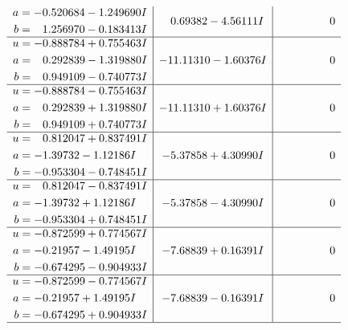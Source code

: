 \documentclass[1p]{elsarticle_modified}
\theoremstyle{definition}
\begin{document}
$$\begin{array}{c|c|c}
\begin{aligned}
a &= -0.520684 - 1.249690 I \\
b &= \phantom{-}1.256970 - 0.183413 I\end{aligned}
 & \phantom{-}0.69382 - 4.56111 I & \phantom{-0.000000 } 0 \\ \hline\begin{aligned}
u &= -0.888784 + 0.755463 I \\
a &= \phantom{-}0.292839 - 1.319880 I \\
b &= \phantom{-}0.949109 - 0.740773 I\end{aligned}
 & -11.11310 - 1.60376 I & \phantom{-0.000000 } 0 \\ \hline\begin{aligned}
u &= -0.888784 - 0.755463 I \\
a &= \phantom{-}0.292839 + 1.319880 I \\
b &= \phantom{-}0.949109 + 0.740773 I\end{aligned}
 & -11.11310 + 1.60376 I & \phantom{-0.000000 } 0 \\ \hline\begin{aligned}
u &= \phantom{-}0.812047 + 0.837491 I \\
a &= -1.39732 - 1.12186 I \\
b &= -0.953304 - 0.748451 I\end{aligned}
 & -5.37858 + 4.30990 I & \phantom{-0.000000 } 0 \\ \hline\begin{aligned}
u &= \phantom{-}0.812047 - 0.837491 I \\
a &= -1.39732 + 1.12186 I \\
b &= -0.953304 + 0.748451 I\end{aligned}
 & -5.37858 - 4.30990 I & \phantom{-0.000000 } 0 \\ \hline\begin{aligned}
u &= -0.872599 + 0.774567 I \\
a &= -0.21957 - 1.49195 I \\
b &= -0.674295 - 0.904933 I\end{aligned}
 & -7.68839 + 0.16391 I & \phantom{-0.000000 } 0 \\ \hline\begin{aligned}
u &= -0.872599 - 0.774567 I \\
a &= -0.21957 + 1.49195 I \\
b &= -0.674295 + 0.904933 I\end{aligned}
 & -7.68839 - 0.16391 I & \phantom{-0.000000 } 0\\
 \hline 
 \end{array}$$\newpage$$\begin{array}{c|c|c}  

\end{array}$$
\end{document}
